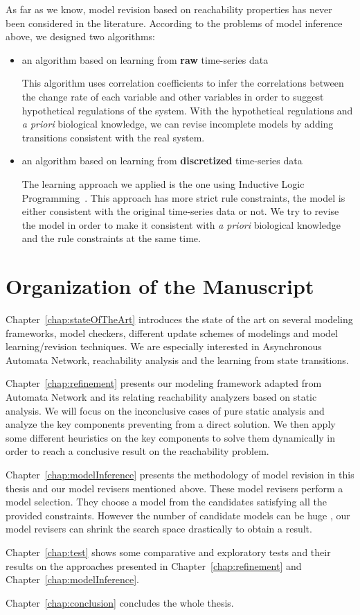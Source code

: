 As far as we know, model revision based on reachability properties has never been considered in the literature.
According to the problems of model inference above, we designed two algorithms:
\begin{itemize}
    \item an algorithm based on learning from \textbf{raw} time-series data
    
    This algorithm uses correlation coefficients to infer the correlations between the change rate of each variable and other variables in order to suggest hypothetical regulations of the system.
    With the hypothetical regulations and \textit{a priori} biological knowledge, we can revise incomplete models by adding transitions consistent with the real system.
    \item an algorithm based on learning from \textbf{discretized} time-series data
    
    The learning approach we applied is the one using Inductive Logic Programming~\cite{ribeiro2018learning}.
    This approach has more strict rule constraints, the model is either consistent with the original time-series data or not.
    We try to revise the model in order to make it consistent with \textit{a priori} biological knowledge and the rule constraints at the same time.
\end{itemize}


\section{Organization of the Manuscript}
Chapter~\ref{chap:stateOfTheArt} introduces the state of the art on several modeling frameworks, model checkers, different update schemes of modelings and model learning/revision techniques.
We are especially interested in Asynchronous Automata Network, reachability analysis and the learning from state transitions.

Chapter~\ref{chap:refinement} presents our modeling framework adapted from Automata Network and its relating reachability analyzers based on static analysis.
We will focus on the inconclusive cases of pure static analysis and analyze the key components preventing from a direct solution.
We then apply some different heuristics on the key components to solve them dynamically in order to reach a conclusive result on the reachability problem.

Chapter~\ref{chap:modelInference} presents the methodology of model revision in this thesis and our model revisers mentioned above.
These model revisers perform a model selection. 
They choose a model from the candidates satisfying all the provided constraints.
However the number of candidate models can be huge%
, our model revisers can shrink the search space drastically to obtain a result.

Chapter~\ref{chap:test} shows some comparative and exploratory tests and their results on the approaches presented in Chapter~\ref{chap:refinement} and Chapter~\ref{chap:modelInference}.

Chapter~\ref{chap:conclusion} concludes the whole thesis.